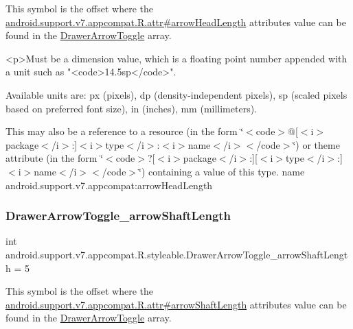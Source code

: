 This symbol is the offset where the \hyperlink{classandroid_1_1support_1_1v7_1_1appcompat_1_1R_1_1attr_aeb28b87d979ed4affb228d5f5e913393}{android.\+support.\+v7.\+appcompat.\+R.\+attr\#arrow\+Head\+Length} attribute\textquotesingle{}s value can be found in the \hyperlink{classandroid_1_1support_1_1v7_1_1appcompat_1_1R_1_1styleable_a7bd3ecc07eb763b454c40c0871959a35}{Drawer\+Arrow\+Toggle} array.

\begin{DoxyVerb}      <p>Must be a dimension value, which is a floating point number appended with a unit such as "<code>14.5sp</code>".
\end{DoxyVerb}
 Available units are\+: px (pixels), dp (density-\/independent pixels), sp (scaled pixels based on preferred font size), in (inches), mm (millimeters). 

This may also be a reference to a resource (in the form \char`\"{}$<$code$>$@\mbox{[}$<$i$>$package$<$/i$>$\+:\mbox{]}$<$i$>$type$<$/i$>$\+:$<$i$>$name$<$/i$>$$<$/code$>$\char`\"{}) or theme attribute (in the form \char`\"{}$<$code$>$?\mbox{[}$<$i$>$package$<$/i$>$\+:\mbox{]}\mbox{[}$<$i$>$type$<$/i$>$\+:\mbox{]}$<$i$>$name$<$/i$>$$<$/code$>$\char`\"{}) containing a value of this type.  name android.\+support.\+v7.\+appcompat\+:arrow\+Head\+Length \mbox{\label{classandroid_1_1support_1_1v7_1_1appcompat_1_1R_1_1styleable_a4b7bc95a81f9491de6faf46ff4f673b2}} 
\subsubsection{\texorpdfstring{Drawer\+Arrow\+Toggle\+\_\+arrow\+Shaft\+Length}{DrawerArrowToggle\_arrowShaftLength}}
{\footnotesize\ttfamily int android.\+support.\+v7.\+appcompat.\+R.\+styleable.\+Drawer\+Arrow\+Toggle\+\_\+arrow\+Shaft\+Length = 5\hspace{0.3cm}{\ttfamily [static]}}

This symbol is the offset where the \hyperlink{classandroid_1_1support_1_1v7_1_1appcompat_1_1R_1_1attr_a067b24dda9f091a098650a5006514996}{android.\+support.\+v7.\+appcompat.\+R.\+attr\#arrow\+Shaft\+Length} attribute\textquotesingle{}s value can be found in the \hyperlink{classandroid_1_1support_1_1v7_1_1appcompat_1_1R_1_1styleable_a7bd3ecc07eb763b454c40c0871959a35}{Drawer\+Arrow\+Toggle} array.

